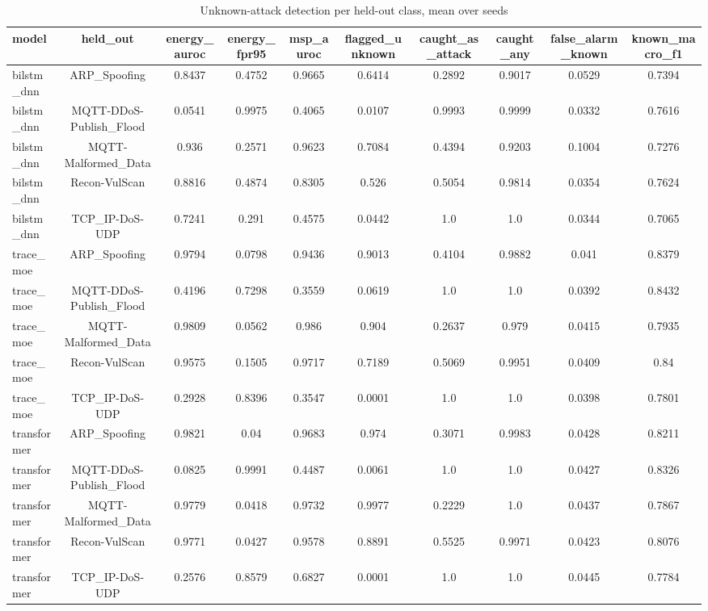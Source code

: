\begin{table}[htbp]
\centering
\caption{Unknown-attack detection per held-out class, mean over seeds}
\label{tab:zero_day}
\begin{tabular}{lccccccccc}
\toprule
model & held\_out & energy\_auroc & energy\_fpr95 & msp\_auroc & flagged\_unknown & caught\_as\_attack & caught\_any & false\_alarm\_known & known\_macro\_f1 \\
\midrule
bilstm\_dnn & ARP\_Spoofing & 0.8437 & 0.4752 & 0.9665 & 0.6414 & 0.2892 & 0.9017 & 0.0529 & 0.7394 \\
bilstm\_dnn & MQTT-DDoS-Publish\_Flood & 0.0541 & 0.9975 & 0.4065 & 0.0107 & 0.9993 & 0.9999 & 0.0332 & 0.7616 \\
bilstm\_dnn & MQTT-Malformed\_Data & 0.936 & 0.2571 & 0.9623 & 0.7084 & 0.4394 & 0.9203 & 0.1004 & 0.7276 \\
bilstm\_dnn & Recon-VulScan & 0.8816 & 0.4874 & 0.8305 & 0.526 & 0.5054 & 0.9814 & 0.0354 & 0.7624 \\
bilstm\_dnn & TCP\_IP-DoS-UDP & 0.7241 & 0.291 & 0.4575 & 0.0442 & 1.0 & 1.0 & 0.0344 & 0.7065 \\
trace\_moe & ARP\_Spoofing & 0.9794 & 0.0798 & 0.9436 & 0.9013 & 0.4104 & 0.9882 & 0.041 & 0.8379 \\
trace\_moe & MQTT-DDoS-Publish\_Flood & 0.4196 & 0.7298 & 0.3559 & 0.0619 & 1.0 & 1.0 & 0.0392 & 0.8432 \\
trace\_moe & MQTT-Malformed\_Data & 0.9809 & 0.0562 & 0.986 & 0.904 & 0.2637 & 0.979 & 0.0415 & 0.7935 \\
trace\_moe & Recon-VulScan & 0.9575 & 0.1505 & 0.9717 & 0.7189 & 0.5069 & 0.9951 & 0.0409 & 0.84 \\
trace\_moe & TCP\_IP-DoS-UDP & 0.2928 & 0.8396 & 0.3547 & 0.0001 & 1.0 & 1.0 & 0.0398 & 0.7801 \\
transformer & ARP\_Spoofing & 0.9821 & 0.04 & 0.9683 & 0.974 & 0.3071 & 0.9983 & 0.0428 & 0.8211 \\
transformer & MQTT-DDoS-Publish\_Flood & 0.0825 & 0.9991 & 0.4487 & 0.0061 & 1.0 & 1.0 & 0.0427 & 0.8326 \\
transformer & MQTT-Malformed\_Data & 0.9779 & 0.0418 & 0.9732 & 0.9977 & 0.2229 & 1.0 & 0.0437 & 0.7867 \\
transformer & Recon-VulScan & 0.9771 & 0.0427 & 0.9578 & 0.8891 & 0.5525 & 0.9971 & 0.0423 & 0.8076 \\
transformer & TCP\_IP-DoS-UDP & 0.2576 & 0.8579 & 0.6827 & 0.0001 & 1.0 & 1.0 & 0.0445 & 0.7784 \\
\bottomrule
\end{tabular}
\end{table}